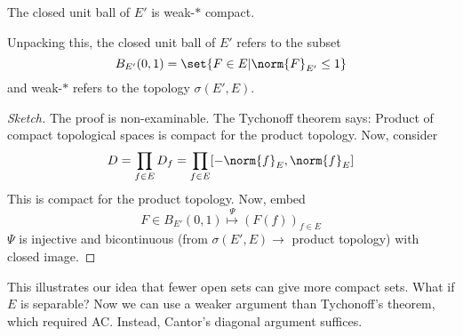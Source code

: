 \documentclass[twoside]{article}
\begin{document}
\begin{thm}
    The closed unit ball of $E'$ is weak-$*$ compact.
\end{thm}
Unpacking this, the closed unit ball of $E'$ refers to the subset
\begin{equation*}
    B_{E'} (0, 1) = \set{F \in E | \norm{F}_{E'} \leq 1}
\end{equation*}
and weak-$*$ refers to the topology $\sigma(E', E)$.
\begin{proof}[Sketch]
    The proof is non-examinable.
    The Tychonoff theorem says: Product of compact topological spaces is compact for the product topology.
    Now, consider
    \begin{equation*}
        D = \prod_{f \in E} D_f = \prod_{f \in E} [-\norm{f}_E, \norm{f}_E]
    \end{equation*}
    This is compact for the product topology.
    Now, embed
    \begin{equation*}
        F \in B_{E'}(0, 1) \overset{\Psi}{\longmapsto} (F(f))_{f \in E}
    \end{equation*}
    $\Psi$ is injective and bicontinuous (from $\sigma(E', E) \to $ product topology) with closed image.
\end{proof}

\begin{remark}
    This illustrates our idea that fewer open sets can give more compact sets.
    What if $E$ is separable? Now we can use a weaker argument than Tychonoff's theorem, which required AC. Instead, Cantor's diagonal argument suffices.
\end{remark}
\color{gray}
\end{document}
